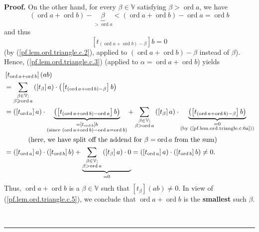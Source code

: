 \documentclass[numbers=enddot,12pt,final,onecolumn,notitlepage]{scrartcl}%
\theoremstyle{definition}
\newenvironment{proof}[1][Proof]{\noindent\textbf{#1.} }{\ \rule{0.5em}{0.5em}}
\let\sumnonlimits\sum
\renewcommand{\sum}{\sumnonlimits\limits}
\renewcommand{\geq}{\geqslant}
\theoremstyle{plainsl}
\begin{document}
\begin{proof}
On the other hand, for every $\beta\in\mathbb{V}$ satisfying $\beta
>\operatorname*{ord}a$, we have%
\[
\left(  \operatorname*{ord}a+\operatorname*{ord}b\right)  -\underbrace{\beta
}_{>\operatorname*{ord}a}<\left(  \operatorname*{ord}a+\operatorname*{ord}%
b\right)  -\operatorname*{ord}a=\operatorname*{ord}b
\]
and thus%
\begin{equation}
\left[  t_{\left(  \operatorname*{ord}a+\operatorname*{ord}b\right)  -\beta
}\right]  b=0 \label{pf.lem.ord.triangle.c.6a}%
\end{equation}
(by (\ref{pf.lem.ord.triangle.c.2}), applied to $\left(  \operatorname*{ord}%
a+\operatorname*{ord}b\right)  -\beta$ instead of $\beta$). Hence,
(\ref{pf.lem.ord.triangle.c.3}) (applied to $\alpha=\operatorname*{ord}%
a+\operatorname*{ord}b$) yields%
\begin{align*}
&  \left[  t_{\operatorname*{ord}a+\operatorname*{ord}b}\right]  \left(
ab\right) \\
&  =\sum_{\substack{\beta\in\mathbb{V};\\\beta\geq\operatorname*{ord}%
a}}\left(  \left[  t_{\beta}\right]  a\right)  \cdot\left(  \left[  t_{\left(
\operatorname*{ord}a+\operatorname*{ord}b\right)  -\beta}\right]  b\right) \\
&  =\left(  \left[  t_{\operatorname*{ord}a}\right]  a\right)  \cdot
\underbrace{\left(  \left[  t_{\left(  \operatorname*{ord}%
a+\operatorname*{ord}b\right)  -\operatorname*{ord}a}\right]  b\right)
}_{\substack{=\left[  t_{\operatorname*{ord}b}\right]  b\\\text{(since
}\left(  \operatorname*{ord}a+\operatorname*{ord}b\right)
-\operatorname*{ord}a=\operatorname*{ord}b\text{)}}}+\sum_{\substack{\beta
\in\mathbb{V};\\\beta>\operatorname*{ord}a}}\left(  \left[  t_{\beta}\right]
a\right)  \cdot\underbrace{\left(  \left[  t_{\left(  \operatorname*{ord}%
a+\operatorname*{ord}b\right)  -\beta}\right]  b\right)  }%
_{\substack{=0\\\text{(by (\ref{pf.lem.ord.triangle.c.6a}))}}}\\
&  \ \ \ \ \ \ \ \ \ \ \left(  \text{here, we have split off the addend for
}\beta=\operatorname*{ord}a\text{ from the sum}\right) \\
&  =\left(  \left[  t_{\operatorname*{ord}a}\right]  a\right)  \cdot\left(
\left[  t_{\operatorname*{ord}b}\right]  b\right)  +\underbrace{\sum
_{\substack{\beta\in\mathbb{V};\\\beta>\operatorname*{ord}a}}\left(  \left[
t_{\beta}\right]  a\right)  \cdot0}_{=0}=\left(  \left[
t_{\operatorname*{ord}a}\right]  a\right)  \cdot\left(  \left[
t_{\operatorname*{ord}b}\right]  b\right)  \neq0.
\end{align*}
Thus, $\operatorname*{ord}a+\operatorname*{ord}b$ is a $\beta\in\mathbb{V}$
such that $\left[  t_{\beta}\right]  \left(  ab\right)  \neq0$. In view of
(\ref{pf.lem.ord.triangle.c.5}), we conclude that $\operatorname*{ord}%
a+\operatorname*{ord}b$ is the \textbf{smallest} such $\beta$.


\end{proof}
\end{document}
